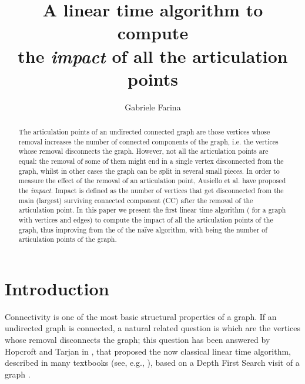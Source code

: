 \documentclass{llncs}
\begin{document}
\title{A linear time algorithm to compute\\ the \emph{impact} of all the articulation points}
\author{Gabriele Farina}
\institute{}
\maketitle
\thispagestyle{empty}

\vspace{-.3cm}

\begin{abstract}
\noindent The articulation points of an undirected connected graph are those vertices whose removal increases the number of connected components of the graph, i.e. the vertices whose removal disconnects the graph. However, not all the articulation points are equal: the removal of some of them might end in a single vertex disconnected from the graph, whilst in other cases the graph can be split in several small pieces. In order to measure the effect of the removal of an articulation point, Ausiello et al. \cite{AFL12} have proposed the \emph{impact}. Impact is defined as the number of vertices that get disconnected from the main (largest) surviving connected component (CC) after the removal of the articulation point. 
In this paper we present the first linear time algorithm ( for a graph with  vertices and  edges) to compute the impact of all the articulation points of the graph, thus improving from the  of the na\"ive algorithm, with  being the number of articulation points of the graph. 

\end{abstract}

\vspace{-.8cm}









\section{Introduction}

Connectivity is one of the most basic structural properties of a graph. If an undirected graph is connected, a natural related question is which are the vertices whose removal disconnects the graph; this question has been answered by Hopcroft and Tarjan in \cite{HT73}, that proposed the now classical linear time algorithm, described in many textbooks (see, e.g., \cite{CLRS09}), based on a Depth First Search visit of a graph \cite{Tar72}.
\end{document}
